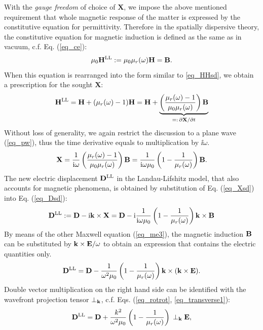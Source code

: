 With the \textit{gauge freedom} of choice of $\mathbf{X}$, we impose the above mentioned requirement that whole magnetic response of the matter is expressed by the constitutive equation for permittivity. Therefore in the spatially dispersive theory, the constitutive equation 
for magnetic induction is defined as the same as in vacuum, c.f. Eq. (\ref{eq_ce}):
\begin{equation} \mu_0 {\mathbf{H}^\text{LL}} := \mu_0 \mu_r(\omega) \mathbf{H} = \mathbf{B}. \label{eq_mu_sd}\end{equation}
When this equation is rearranged into the form similar to \ref{eq_HHsd}, we obtain a prescription for the sought $\mathbf{X}$: 
$$ {\mathbf{H}^\text{LL}} = \mathbf{H} + (\mu_r(\omega) -1)\mathbf{H} = \mathbf{H} + \underbrace{\left(\frac{\mu_r(\omega)-1}{\mu_0\mu_r(\omega)}\right)\mathbf{B}}_{=:\,\partial\mathbf{X}/\partial t}$$
Without loss of generality, we again restrict the discussion to a plane wave (\ref{eq_pw}), thus the time derivative equals to multiplication by $\ii\omega$.
\begin{equation} \mathbf{X} = \frac{1}{{\mathrm i}\omega}\left(\frac{\mu_r(\omega)-1}{\mu_0\mu_r(\omega)}\right)\mathbf{B} = \frac{1}{{\mathrm i}\omega\mu_0}\left(1 - \frac{1}{\mu_r(\omega)}\right)\mathbf{B}. \label{eq_Xsd}\end{equation}
The new electric displacement ${\mathbf{D}^\text{LL}}$ in the  Landau-Lifshitz model, that also accounts for magnetic phenomena, is obtained by substitution of Eq. (\ref{eq_Xsd}) into Eq. (\ref{eq_Dsd}):
\begin{equation} {\mathbf{D}^\text{LL}} := \mathbf{D} - {\mathrm i}{\mathbf{k}}\times \mathbf{X} =  \mathbf{D} - {\mathrm i}  \frac{1}{{\mathrm i}\omega\mu_0}\left(1 - \frac{1}{\mu_r(\omega)}\right) {\mathbf{k}}\times \mathbf{B}  \label{eq_Dsd2}\end{equation}
By means of the other Maxwell equation (\ref{eq_me3}), the magnetic induction $\mathbf{B}$ can be substituted by ${\mathbf{k}}\times\mathbf{E} / \omega$ to obtain an expression that contains the electric quantities only.
\begin{equation} {\mathbf{D}^\text{LL}} = \mathbf{D} - \frac{1}{\omega^2 \mu_0}\left(1 - \frac{1}{\mu_r(\omega)}\right) {\mathbf{k}}\times({\mathbf{k}}\times \mathbf{E}).  \label{eq_Dsd3}\end{equation} 
Double vector multiplication on the right hand side can be identified with the wavefront projection tensor $\perp_{\mathbf{k}}$, c.f. Eqs. (\ref{eq_rotrot}, \ref{eq_transverse1}):
\begin{equation} {\mathbf{D}^\text{LL}} = \mathbf{D} + \frac{k^2}{\omega^2 \mu_0}\left(1 - \frac{1}{\mu_r(\omega)}\right) \, \perp_{\mathbf{k}} \mathbf{E},  \label{eq_Dsd4}\end{equation} 


